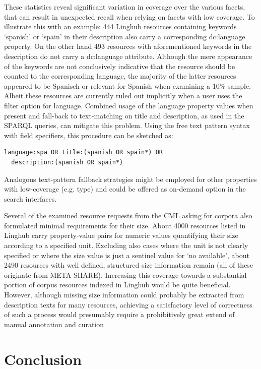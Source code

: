 \documentclass[smallextended]{svjour3}       %
\begin{document}
These statistics reveal significant variation in coverage over the various
facets, that can result in unexpected recall when relying on facets with low
coverage. To illustrate this with an example: 444 Linghub resources containing
keywords `spanish' or `spain' in their description also carry a corresponding
dc:language property. On the other hand 493 resources with aforementioned
keywords in the description do not carry a dc:language attribute. Although the
mere appearance of the keywords are not conclusively indicative that the
resource should be counted to the corresponding language, the majority of the
latter resources appeared to be Spanisch or relevant for Spanish when examining
a 10\% sample. Albeit these resources are currently ruled out implicitly when a
user uses the filter option for language. Combined usage of the language
property values when present and fall-back to text-matching on title and
description, as used in the SPARQL queries, can mitigate this problem. Using the
free text pattern syntax with field specifiers, this procedure can be sketched
as: 

\begin{verbatim}
language:spa OR title:(spanish OR spain*) OR 
  description:(spanish OR spain*)
\end{verbatim}

Analogous text-pattern fallback strategies might be employed for other
properties with low-coverage (e.g. type) and could be offered as on-demand
option in the search interfaces. 

Several of the examined resource requests from the CML asking for corpora also
formulated minimal requirements for their size. About 4000 resources listed in
Linghub carry property-value pairs for numeric values quantifying their size
according to a specified unit. Excluding also cases where the unit is not
clearly specified or where the size value is just a sentinel value for ‘no
available’, about 2490 resources with well defined, structured size information
remain (all of these originate from META-SHARE).  Increasing this coverage
towards a substantial portion of corpus resources indexed in Linghub would be
quite beneficial. However, although missing size information could probably be
extracted from description texts for many resources, achieving a satisfactory
level of correctness of such a process would presumably require a prohibitively
great extend of manual annotation and curation


\section{Conclusion}
\label{conclusion}


\end{document}
